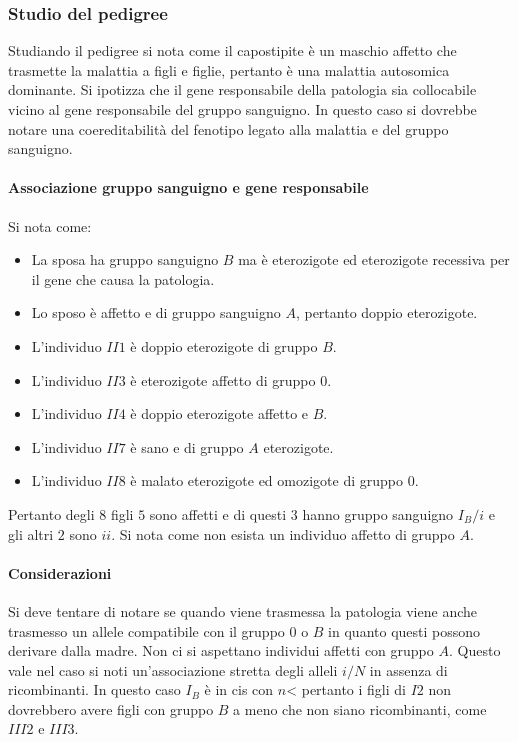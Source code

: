 		\subsubsection{Studio del pedigree}
		Studiando il pedigree si nota come il capostipite \`e un maschio affetto che trasmette la malattia a figli e figlie, pertanto \`e una malattia autosomica dominante.
		Si ipotizza che il gene responsabile della patologia sia collocabile vicino al gene responsabile del gruppo sanguigno.
		In questo caso si dovrebbe notare una coereditabilit\`a del fenotipo legato alla malattia e del gruppo sanguigno.

			\paragraph{Associazione gruppo sanguigno e gene responsabile}
			Si nota come:
			\begin{multicols}{2}
				\begin{itemize}
					\item La sposa ha gruppo sanguigno $B$ ma \`e eterozigote ed eterozigote recessiva per il gene che causa la patologia.
					\item Lo sposo \`e affetto e di gruppo sanguigno $A$, pertanto doppio eterozigote.
					\item L'individuo $II1$ \`e doppio eterozigote di gruppo $B$.
					\item L'individuo $II3$ \`e eterozigote affetto di gruppo $0$.
					\item L'individuo $II4$ \`e doppio eterozigote affetto e $B$.
					\item L'individuo $II7$ \`e sano e di gruppo $A$ eterozigote.
					\item L'individuo $II8$ \`e malato eterozigote ed omozigote di gruppo $0$.
				\end{itemize}
			\end{multicols}
			Pertanto degli $8$ figli $5$ sono affetti e di questi $3$ hanno gruppo sanguigno $I_B/i$ e gli altri $2$ sono $ii$.
			Si nota come non esista un individuo affetto di gruppo $A$.

			\paragraph{Considerazioni}
			Si deve tentare di notare se quando viene trasmessa la patologia viene anche trasmesso un allele compatibile con il gruppo $0$ o $B$ in quanto questi possono derivare dalla madre.
			Non ci si aspettano individui affetti con gruppo $A$.
			Questo vale nel caso si noti un'associazione stretta degli alleli $i/N$ in assenza di ricombinanti.
			In questo caso $I_B$ \`e in cis con $n$< pertanto i figli di $I2$ non dovrebbero avere figli con gruppo $B$ a meno che non siano ricombinanti, come $III2$ e $III3$.

